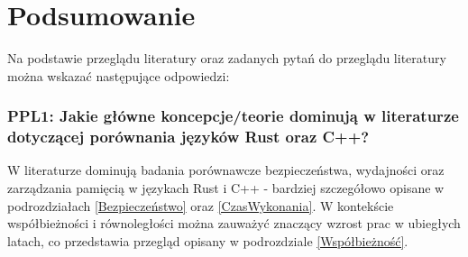% 


\section{Podsumowanie}
Na podstawie przeglądu literatury oraz zadanych pytań do przeglądu literatury można wskazać następujące odpowiedzi:
\subsubsection{PPL1: Jakie główne koncepcje/teorie dominują w literaturze dotyczącej porównania języków Rust oraz C++?}
W literaturze dominują badania porównawcze bezpieczeństwa, wydajności oraz zarządzania pamięcią w językach Rust i C++ - bardziej szczegółowo opisane w podrozdziałach \ref{Bezpieczeństwo} oraz \ref{CzasWykonania}. W kontekście współbieżności i równoległości można zauważyć znaczący wzrost prac w ubiegłych latach, co przedstawia przegląd opisany w podrozdziale \ref{Współbieżność}.

